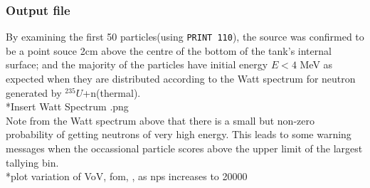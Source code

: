 \documentclass[a4paper, 12pt]{article}
\begin{document}
\subsubsection{Output file}
By examining the first 50 particles(using \texttt{PRINT 110}), the source was confirmed to be a point souce 2cm above the centre of the bottom of the tank's internal surface; and the majority of the particles have initial energy $E<4$ MeV as expected when they are distributed according to the Watt spectrum for neutron generated by ${}^{235}U$+n(thermal).
\\*Insert Watt Spectrum .png
\\Note from the Watt spectrum above that there is a small but non-zero probability of getting neutrons of very high energy. This leads to some warning messages when the occassional particle scores above the upper limit of the largest tallying bin.
\\*plot variation of VoV, fom, , as nps increases to 20000\\
\end{document}
